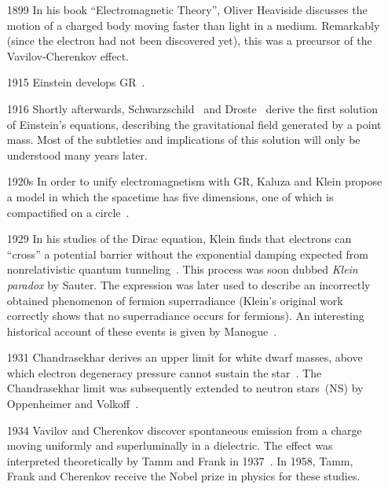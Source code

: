 \documentclass[11pt]{article}
\numberwithin{equation}{section} %
\begin{document}
\begin{itemize}[noitemsep]

\item[1899] In his book ``Electromagnetic Theory'', Oliver Heaviside discusses the motion of a charged body moving faster than light in a medium. Remarkably (since the electron had not been discovered yet), this was a precursor of the Vavilov-Cherenkov effect.

\item[1915] Einstein develops GR~\cite{Einstein:1916vd}.
 
\item[1916] Shortly afterwards, Schwarzschild~\cite{Schwarzschild:1916uq} and Droste~\cite{Droste:2017} derive the first solution of
Einstein's equations, describing the gravitational field generated by a point mass. Most of the subtleties and implications of this solution will only be understood many years later. 


\item[1920s] In order to unify electromagnetism with GR, Kaluza
and Klein propose a model in which the spacetime has five dimensions, one of
which is compactified on a circle~\cite{Kaluza:1921tu,Klein:1926tv}.

\item[1929] In his studies of the Dirac equation, Klein finds that electrons can ``cross'' a potential barrier without the exponential damping expected from nonrelativistic quantum tunneling~\cite{Kleinparadox}. This process was soon dubbed \emph{Klein paradox} by Sauter. The expression was later used to describe an incorrectly obtained phenomenon of fermion superradiance (Klein's original work correctly shows that no superradiance occurs for fermions). An interesting historical account of these events is given by Manogue~\cite{Manogue1988}.
 
\item[1931] Chandrasekhar derives an upper limit for white dwarf masses,
above which electron degeneracy pressure cannot sustain the star~\cite{Chandrasekhar:1931ih}. 
The Chandrasekhar limit was subsequently extended to neutron stars~(NS) by Oppenheimer and 
Volkoff~\cite{Oppenheimer:1939ne}.

\item[1934] Vavilov and Cherenkov discover spontaneous emission from a charge moving uniformly and superluminally in a dielectric. The effect was interpreted theoretically by Tamm and Frank in 1937~\cite{TammFrank}. In 1958, Tamm, Frank and Cherenkov receive the Nobel prize in physics for these studies.
 

\end{itemize}
\end{document}
